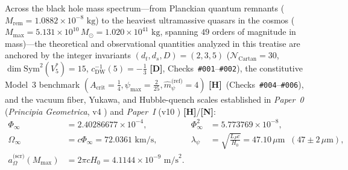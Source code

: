 \documentclass[11pt,a4paper]{article}
\newcommand{\catD}{\textbf{\textcolor{blue!75!black}{[D]}}}
\newcommand{\catH}{\textbf{\textcolor{orange!85!black}{[H]}}}
\newcommand{\catN}{\textbf{\textcolor{teal!75!black}{[N]}}}
\theoremstyle{plain}
\theoremstyle{definition}
\theoremstyle{remark}
\numberwithin{equation}{section}
\begin{document}
Across the black hole mass spectrum---from Planckian quantum remnants ($M_{\text{rem}} = 1.0882 \times 10^{-8}\text{ kg}$) to the heaviest ultramassive quasars in the cosmos ($M_{\max} = 5.131 \times 10^{10}\,M_\odot = 1.020 \times 10^{41}\text{ kg}$, spanning $49$ orders of magnitude in mass)---the theoretical and observational quantities analyzed in this treatise are anchored by the integer invariants $(d_t, d_s, D) = (2, 3, 5)$ ($\mathcal{N}_{\text{Cartan}} = 30$, $\dim\mathrm{Sym}^2(V_5^*) = 15$, $c_{\text{DW}}^{-1}(5) = -\frac{1}{3}$ \catD, Checks~\texttt{\#001}--\texttt{\#002}), the constitutive Model~3 benchmark $(A_{\text{crit}} = \frac{1}{4}, \psi_{\max} = \frac{2}{25}, \hat{m}_{\psi}^{\text{(ref)}} = 4)$ \catH\ (Checks~\texttt{\#004}--\texttt{\#006}), and the vacuum fiber, Yukawa, and Hubble-quench scales established in \textit{Paper~0} (\textit{Principia Geometrica}, v4 \cite{jimenez2026_p0}) and \textit{Paper~I} (v10 \cite{jimenez2026a}) \catH/\catN:
\begin{align}
\Phi_{\infty} &= 2.40286677 \times 10^{-4}, & \Phi_{\infty}^2 &= 5.773769 \times 10^{-8}, \nonumber \\[3pt]
\Omega_{\infty} &= c\Phi_{\infty} = 72.0361\text{ km/s}, & \lambda_{\psi} &= \sqrt{\frac{L_P c}{H_0}} = 47.10\,\mu\text{m} \;\; (47 \pm 2\,\mu\text{m}), \nonumber \\[3pt]
a_{\Omega}^{\text{(scr)}}\!\left(M_{\max}\right) &= 2\pi c H_0 = 4.1144 \times 10^{-9}\text{ m/s}^2. & &
\label{eq:master_synthesis_invariants}
\end{align}
\end{document}

